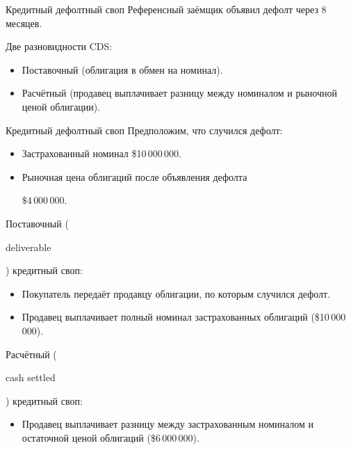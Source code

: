 \documentclass{beamer}
\newcommand{\en}[1]{\begin{otherlanguage}{english}#1\end{otherlanguage}}
\begin{document}
\begin{frame}{Кредитный дефолтный своп}
\justify
Референсный заёмщик объявил дефолт через 8 месяцев.

\justify
\centering
{}


\justify
Две разновидности CDS:
\begin{itemize}
\justifying
\item Поставочный (облигация в обмен на номинал).
\item Расчётный (продавец выплачивает разницу между номиналом и рыночной ценой облигации).
\end{itemize}
\end{frame}



\begin{frame}{Кредитный дефолтный своп}
\justify
Предположим, что случился дефолт:
\begin{itemize}
\justifying
\item Застрахованный номинал \$10\,000\,000.
\item Рыночная цена облигаций после объявления дефолта

$\$4\,000\,000$.
\end{itemize}

\justify
\alert{Поставочный} (\en{deliverable}) кредитный своп:
\begin{itemize}
\justifying
\item Покупатель передаёт продавцу облигации, по которым случился дефолт.
\item Продавец выплачивает полный номинал застрахованных облигаций (\$10\,000\,000).
\end{itemize}

\justify
\alert{Расчётный} (\en{cash settled}) кредитный своп:
\begin{itemize}
\justifying
\item Продавец выплачивает разницу между застрахованным номиналом и остаточной ценой облигаций (\$6\,000\,000).
\end{itemize}

\end{frame}
\end{document}
